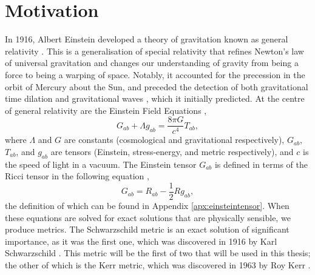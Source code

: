 \section{Motivation}\label{sec:motivation}

In 1916, Albert Einstein developed a theory of gravitation known as general relativity \cite{einsteinGR}.
This is a generalisation of special relativity that refines Newton's law of universal gravitation and changes our understanding of gravity from being a force to being a warping of space.
Notably, it accounted for the precession in the orbit of Mercury about the Sun, and preceded the detection of both gravitational time dilation \cite{gravTimeDilateDetect} and gravitational waves \cite{gravWaveDetectPaper}, which it initially predicted.
At the centre of general relativity are the Einstein Field Equations \cite{einsteinFieldEquations},
\begin{equation}
G_{ab}+\Lambda g_{ab}=\frac{8\pi G}{c^4}T_{ab},
\end{equation}
where $\Lambda$ and $G$ are constants (cosmological and gravitational respectively), $G_{ab}$, $T_{ab}$, and $g_{ab}$ are tensors (Einstein, stress-energy, and metric respectively), and $c$ is the speed of light in a vacuum.
The Einstein tensor $G_{ab}$ is defined in terms of the Ricci tensor in the following equation \cite{einsteinFieldEquations},
\begin{equation}
G_{ab}=R_{ab}-\frac{1}{2}Rg_{ab},
\end{equation}
the definition of which can be found in Appendix \ref{apx:einsteintensor}.
When these equations are solved for exact solutions that are physically sensible, we produce metrics.
The Schwarzschild metric is an exact solution of significant importance, as it was the first one, which was discovered in 1916 by Karl Schwarzschild \cite{schwarz1916}.
This metric will be the first of two that will be used in this thesis; the other of which is the Kerr metric, which was discovered in 1963 by Roy Kerr \cite{kerrMetric}.

